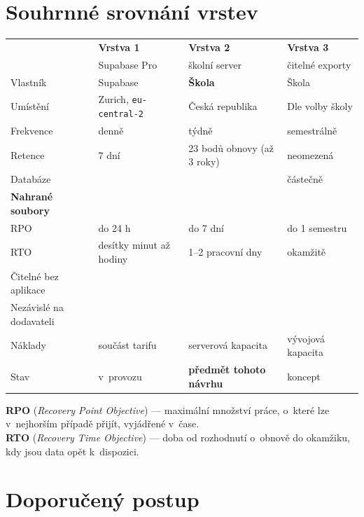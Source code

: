 \documentclass[11pt,a4paper]{article}
\newcommand{\ano}{\textcolor{accent}{\ding{51}}}
\newcommand{\nepokr}{\textcolor{warnln}{\ding{55}}}
\begin{document}
\section{Souhrnné srovnání vrstev}

\begin{center}
\begin{tabularx}{\textwidth}{@{}p{2.7cm}XXX@{}}
\toprule
 & \textbf{Vrstva 1} & \textbf{Vrstva 2} & \textbf{Vrstva 3} \\
 & {\footnotesize Supabase Pro} & {\footnotesize školní server} & {\footnotesize čitelné exporty} \\
\midrule
Vlastník & Supabase & \textbf{Škola} & Škola \\
Umístění & Zurich, \texttt{eu-central-2} & Česká republika & Dle volby školy \\
Frekvence & denně & týdně & semestrálně \\
Retence & 7 dní & 23 bodů obnovy (až 3 roky) & neomezená \\
Databáze & \ano & \ano & částečně \\
\textbf{Nahrané soubory} & \textbf{\nepokr} & \textbf{\ano} & \ano \\
RPO & do 24 h & do 7 dní & do 1 semestru \\
RTO & desítky minut až hodiny & 1--2 pracovní dny & okamžitě \\
Čitelné bez aplikace & \nepokr & \nepokr & \ano \\
Nezávislé na dodavateli & \nepokr & \ano & \ano \\
Náklady & součást tarifu & serverová kapacita & vývojová kapacita \\
Stav & \ano v~provozu & \textbf{předmět tohoto návrhu} & koncept \\
\bottomrule
\end{tabularx}
\end{center}

\medskip
\noindent
\textbf{RPO} (\emph{Recovery Point Objective}) --- maximální množství práce, o~které lze v~nejhorším
případě přijít, vyjádřené v~čase.\\
\textbf{RTO} (\emph{Recovery Time Objective}) --- doba od rozhodnutí o~obnově do okamžiku, kdy jsou
data opět k~dispozici.

\section{Doporučený postup}
\end{document}
